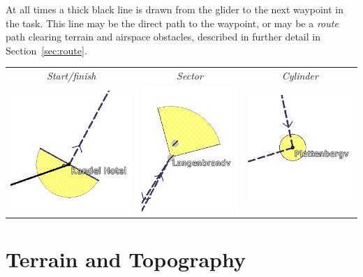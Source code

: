 At all times a thick black line is drawn from the glider to the next
waypoint in the task.  This line may be the direct path to the waypoint,
or may be a {\em route} path clearing terrain and airspace obstacles, described in
further detail in Section~\ref{sec:route}.

\begin{center}
\begin{tabular}{c c c}
{\it Start/finish} & {\it Sector} & {\it Cylinder} \\
\includegraphics[angle=0,width=0.3\linewidth,keepaspectratio='true']{figures/cut-startfinish.png} &
\includegraphics[angle=0,width=0.3\linewidth,keepaspectratio='true']{figures/cut-sector.png} &
\includegraphics[angle=0,width=0.3\linewidth,keepaspectratio='true']{figures/cut-barrel.png} \\
\end{tabular}
\end{center}


\section{Terrain and Topography}\label{sec:terrain_topo}


